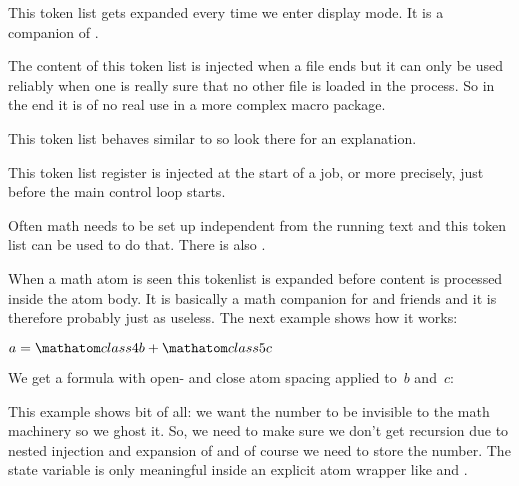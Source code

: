 \startoldprimitive[title={\prm {everydisplay}}]

This token list gets expanded every time we enter display mode. It is a companion
of .

\stopoldprimitive

\startoldprimitive[title={\prm {everyeof}}]

The content of this token list is injected when a file ends but it can only be
used reliably when one is really sure that no other file is loaded in the
process. So in the end it is of no real use in a more complex macro package.

\stopoldprimitive

\startoldprimitive[title={\prm {everyhbox}}]

This token list behaves similar to  so look there for an
explanation.

\stopoldprimitive

\startoldprimitive[title={\prm {everyjob}}]

This token list register is injected at the start of a job, or more precisely,
just before the main control loop starts.

\stopoldprimitive

\startoldprimitive[title={\prm {everymath}}]

Often math needs to be set up independent from the running text and this token
list can be used to do that. There is also .

\stopoldprimitive

\startnewprimitive[title={\prm {everymathatom}}]

When a math atom is seen this tokenlist is expanded before content is processed
inside the atom body. It is basically a math companion for  and
friends and it is therefore probably just as useless. The next example shows how
it works:

\startbuffer
\everymathatom
  {\begingroup
   \scratchcounter\lastatomclass
   \everymathatom{}%
   \endgroup}

$ a = \mathatom class 4 {b} + \mathatom class 5 {c} $
\stopbuffer

\typebuffer

We get a formula with open- and close atom spacing applied to~$b$ and~$c$:

{\getbuffer}

This example shows bit of all: we want the number to be invisible to the math
machinery so we ghost it. So, we need to make sure we don't get recursion due to
nested injection and expansion of  and of course we need to
store the number. The  state variable is only meaningful
inside an explicit atom wrapper like  and .


